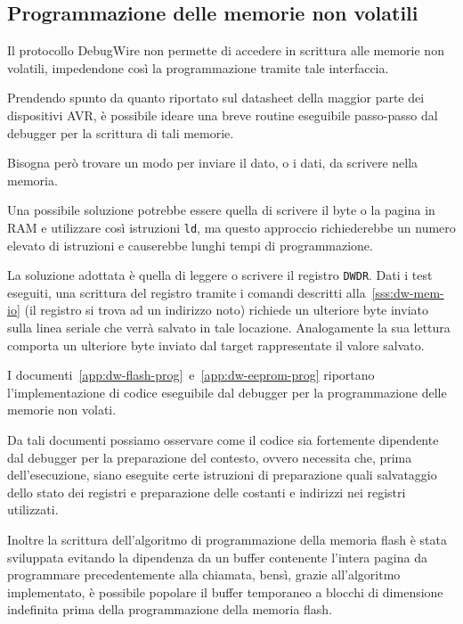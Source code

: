 \subsection{Programmazione delle memorie non volatili}

Il protocollo DebugWire non permette di accedere in scrittura alle memorie non volatili, impedendone così la programmazione tramite tale interfaccia.

Prendendo spunto da quanto riportato sul datasheet della maggior parte dei dispositivi AVR\cite[34]{avr:m328p}\cite[sec 26.2.5]{avr:m328p}, è possibile ideare una breve routine eseguibile passo-passo dal debugger per la scrittura di tali memorie.

Bisogna però trovare un modo per inviare il dato, o i dati, da scrivere nella memoria.

Una possibile soluzione potrebbe essere quella di scrivere il byte o la pagina in RAM e utilizzare così istruzioni \texttt{ld}, ma questo approccio richiederebbe un numero elevato di  istruzioni e causerebbe lunghi tempi di programmazione.

La soluzione adottata è quella di leggere o scrivere il registro \texttt{DWDR}. Dati i test eseguiti, una scrittura del registro tramite i comandi descritti alla~\cref{sss:dw-mem-io} (il registro si trova ad un indirizzo noto) richiede un ulteriore byte inviato sulla linea seriale che verrà salvato in tale locazione\cite{site:dw-reverse-engeneering}. Analogamente la sua lettura comporta un ulteriore byte inviato dal target rappresentate il valore salvato\cite{site:dw-reverse-engeneering}.

I documenti~\ref{app:dw-flash-prog}~e~\ref{app:dw-eeprom-prog} riportano l'implementazione di codice eseguibile dal debugger per la programmazione delle memorie non volati.

Da tali documenti possiamo osservare come il codice sia fortemente dipendente dal debugger per la preparazione del contesto, ovvero necessita che, prima dell'esecuzione, siano eseguite certe istruzioni di preparazione quali salvataggio dello stato dei registri e preparazione delle costanti e indirizzi nei registri utilizzati.

Inoltre la scrittura dell'algoritmo di programmazione della memoria flash è stata sviluppata evitando la dipendenza da un buffer contenente l'intera pagina da programmare precedentemente alla chiamata, bensì, grazie all'algoritmo implementato, è possibile popolare il buffer temporaneo a blocchi di dimensione indefinita prima della programmazione della memoria flash.

